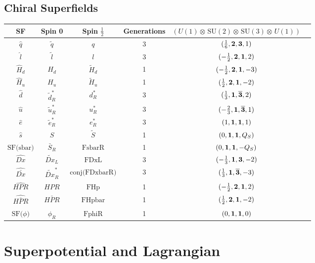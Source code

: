 \subsection{Chiral Superfields} 
\begin{center} 
\begin{tabular}{|c|c|c|c|c|c|} 
\hline \hline 
SF & Spin 0 & Spin \(\frac{1}{2}\) & Generations & \((U(1)\otimes\, \text{SU}(2)\otimes\, \text{SU}(3)\otimes\, U(1))\) \\ 
\hline 
\(\hat{q}\) & \(\tilde{q}\) & \(q\) & 3 & \((\frac{1}{6},{\bf 2},{\bf 3},1) \) \\ 
\(\hat{l}\) & \(\tilde{l}\) & \(l\) & 3 & \((-\frac{1}{2},{\bf 2},{\bf 1},2) \) \\ 
\(\hat{H}_d\) & \(H_d\) & \(\tilde{H}_d\) & 1 & \((-\frac{1}{2},{\bf 2},{\bf 1},-3) \) \\ 
\(\hat{H}_u\) & \(H_u\) & \(\tilde{H}_u\) & 1 & \((\frac{1}{2},{\bf 2},{\bf 1},-2) \) \\ 
\(\hat{d}\) & \(\tilde{d}_R^*\) & \(d_R^*\) & 3 & \((\frac{1}{3},{\bf 1},{\bf \overline{3}},2) \) \\ 
\(\hat{u}\) & \(\tilde{u}_R^*\) & \(u_R^*\) & 3 & \((-\frac{2}{3},{\bf 1},{\bf \overline{3}},1) \) \\ 
\(\hat{e}\) & \(\tilde{e}_R^*\) & \(e_R^*\) & 3 & \((1,{\bf 1},{\bf 1},1) \) \\ 
\(\hat{s}\) & \(S\) & \(\tilde{S}\) & 1 & \((0,{\bf 1},{\bf 1},Q_{S}) \) \\ 
\(\text{SF}\Big(\text{sbar}\Big)\) & \(\bar{S}_R\) & \(\text{FsbarR}\) & 1 & \((0,{\bf 1},{\bf 1},- Q_{S} ) \) \\ 
\(\hat{Dx}\) & \(\tilde{Dx}_L\) & \(\text{FDxL}\) & 3 & \((-\frac{1}{3},{\bf 1},{\bf 3},-2) \) \\ 
\(\hat{\bar{Dx}}\) & \(\tilde{Dx}_R^*\) & \(\text{conj}\Big(\text{FDxbarR}\Big)\) & 3 & \((\frac{1}{3},{\bf 1},{\bf \overline{3}},-3) \) \\ 
\(\hat{HPR}\) & \(HPR\) & \(\text{FHp}\) & 1 & \((-\frac{1}{2},{\bf 2},{\bf 1},2) \) \\ 
\(\hat{\bar{HPR}}\) & \(\bar{HPR}\) & \(\text{FHpbar}\) & 1 & \((\frac{1}{2},{\bf 2},{\bf 1},-2) \) \\ 
\(\text{SF}\Big(\phi \Big)\) & \(\phi_R\) & \(\text{FphiR}\) & 1 & \((0,{\bf 1},{\bf 1},0) \) \\ 
\hline \hline
\end{tabular} 
\end{center} 
\section{Superpotential and Lagrangian} 
